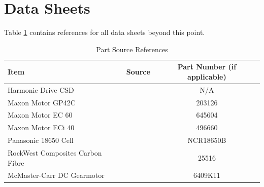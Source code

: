 \section{Data Sheets} \label{app:data_sheets}

Table \ref{table:data_sheets} contains references for all data sheets beyond this point.

\begin{center}
    \begin{longtable}{ l c c }
        \caption{Part Source References}
        \label{table:data_sheets}
         \\ \hline
        Item & Source & Part Number (if applicable)
        \\ \hline
        Harmonic Drive CSD & \cite{harmonic_drive_csd-2a_nodate} & N/A
        \\ \hline
        Maxon Motor GP42C & \cite{maxon_motor_maxon_nodate} & 203126
        \\ \hline
        Maxon Motor EC 60 & \cite{maxon_motor_ec60_nodate} & 645604
        \\ \hline
        Maxon Motor ECi 40 & \cite{maxon_motor_maxon_nodate} & 496660
        \\ \hline
        Panasonic 18650 Cell & \cite{panasonic_industrial_devices_specifications_nodate} & NCR18650B
        \\ \hline
        RockWest Composites Carbon Fibre & \cite{rock_west_composites_rock_nodate} & 25516
         \\ \hline
         McMaster-Carr DC Gearmotor & \cite{mcmaster-carr_mcmaster-carr_nodate} & 6409K11
         \\ \hline
    \end{longtable}
\end{center}








